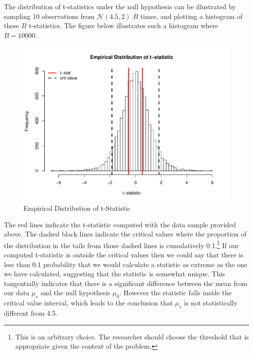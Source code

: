 \documentclass[12pt]{article}
\begin{document}
\noindent The distribution of t-statistics under the null hypothesis can be illustrated by sampling 10 observations from $\mathcal{N}(4.5,2)$ $B$ times, and plotting a histogram of these $B$ t-statistics. The figure below illustrates such a histogram where $B = 10000$.

\begin{figure}[H]\caption[]{Empirical Distribution of t-Statistic}
\centering
\begin{minipage}{0.6\linewidth}
\includegraphics[trim={0cm 0cm 0cm 1.5cm}, clip, scale=0.6]{../figs/ttest_dist.pdf}
\end{minipage}
\end{figure}

\noindent The red lines indicate the t-statistic computed with the data sample provided above. The dashed black lines indicate the critical values where the proportion of the distribution in the tails from those dashed lines is cumulatively 0.1.\footnote{This is an arbitrary choice. The researcher should choose the threshold that is appropriate given the context of the problem.} If our computed t-statistic is outside the critical values then we could say that there is less than 0.1 probability that we would calculate a statistic as extreme as the one we have calculated, suggesting that the statistic is somewhat unique. This tangentially indicates that there is a significant difference between the mean from our data $\mu_s$ and the null hypothesis $\mu_0$. However the statistic falls inside the critical value interval, which leads to the conclusion that $\mu_s$ is not statistically different from 4.5. \\
\end{document}

